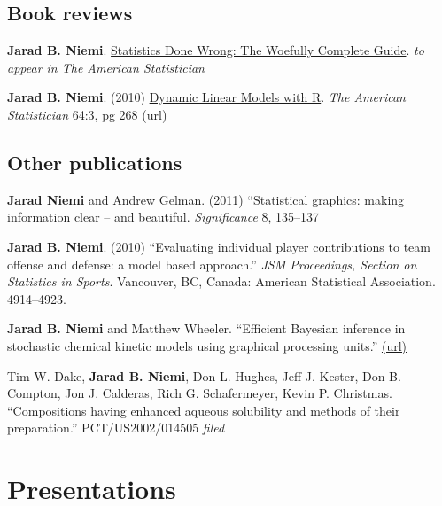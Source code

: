 \documentclass[overlapped,line]{res}
\begin{document}
\begin{resume}
\subsection{\bf Book reviews}

{\bf Jarad B. Niemi}. \underline{Statistics Done Wrong: The Woefully Complete Guide}. \emph{to appear in The American Statistician} 

{\bf Jarad B. Niemi}. (2010) \underline{Dynamic Linear Models with R}. \emph{The American Statistician} 64:3, pg 268 \href{http://dx.doi.org/10.1198/tast.2010.br643}{(url)}




\subsection{\bf Other publications}

{\bf Jarad Niemi } and Andrew Gelman. (2011) ``Statistical graphics: making information clear -- and beautiful. \emph{Significance} 8, 135--137

{\bf Jarad B. Niemi}. (2010) ``Evaluating individual player contributions to team offense and defense: a model based approach.'' \emph{JSM Proceedings, Section on Statistics in Sports}. Vancouver, BC, Canada: American Statistical Association. 4914--4923.

{\bf Jarad B. Niemi} and Matthew Wheeler. ``Efficient Bayesian inference in stochastic chemical kinetic models using graphical processing units.'' \href{http://arxiv.org/abs/1101.4242}{(url)}

Tim W. Dake, {\bf Jarad B. Niemi}, Don L. Hughes, Jeff J. Kester, Don B. Compton, Jon J. Calderas, Rich G. Schafermeyer, Kevin P. Christmas. ``Compositions having enhanced aqueous solubility and methods of their preparation.'' PCT/US2002/014505 \emph{filed}



\section{\bf Presentations}

%


\end{resume}
\end{document}
